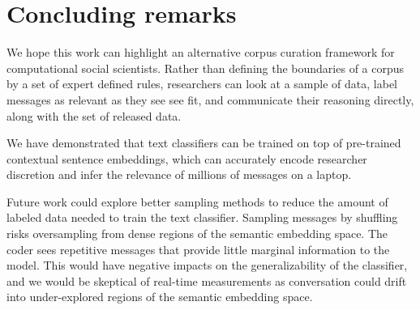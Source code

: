 \section{Concluding remarks}
\label{sec:corpusCreation.concludingremarks}



We hope this work can highlight
an alternative corpus curation framework
for computational social scientists. 
Rather than defining the boundaries of a corpus by a set of expert defined rules,
researchers can look at a sample of data, 
label messages as relevant as they see see fit,
and communicate their reasoning directly,
along with the set of released data.

We have demonstrated that text classifiers can be trained on top of pre-trained contextual sentence embeddings,
which can accurately encode researcher discretion
and infer the relevance of millions of messages on a laptop. %




Future work could explore better sampling methods
to reduce the amount of labeled data needed to train the text classifier. 
Sampling messages by shuffling
risks oversampling
from dense regions of the semantic embedding space. 
The coder sees repetitive messages that provide little marginal 
information to the model.
This would have negative impacts on the generalizability of the classifier, and we would be skeptical of real-time measurements as conversation could drift into under-explored regions of the semantic embedding space.